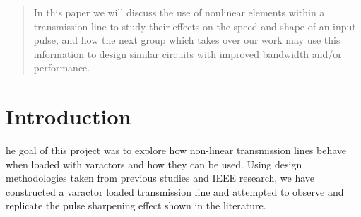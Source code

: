 \documentclass[journal]{IEEEtran}
\begin{document}







\maketitle

\begin{abstract}
 In this paper we will discuss the use of nonlinear elements within
a transmission line to study their effects on the speed and shape of
an input pulse, and how the next group which takes over our work may use this information to design similar circuits with improved bandwidth and/or performance.
\end{abstract}







%
\IEEEpeerreviewmaketitle



\section{Introduction}
% 
% 
% 
% 
he goal of this project was to explore how non-linear transmission lines behave when loaded with varactors and how they can be used. Using design methodologies taken from previous studies and IEEE research, we have constructed a varactor loaded transmission line and attempted to observe and replicate the pulse sharpening effect shown in the literature.
\end{document}
